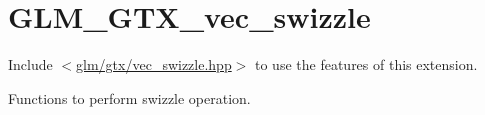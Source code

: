 \hypertarget{group__gtx__vec__swizzle}{}\section{G\+L\+M\+\_\+\+G\+T\+X\+\_\+vec\+\_\+swizzle}
\label{group__gtx__vec__swizzle}
Include $<$\hyperlink{vec__swizzle_8hpp}{glm/gtx/vec\+\_\+swizzle.\+hpp}$>$ to use the features of this extension.

Functions to perform swizzle operation. 
